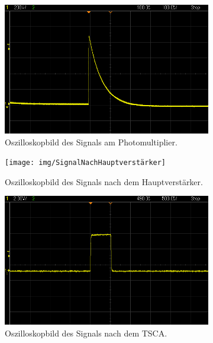 \begin{figure}[H]
	\centering
	\begin{subfigure}[t]{0.495\textwidth}
		\centering
		\includegraphics[width=\textwidth]{img/SignalNachPhotomultiplier}
		\caption{Oszilloskopbild des Signals am Photomultiplier.}
		\label{SignalNachPhotomultiplier}
	\end{subfigure}
	\begin{subfigure}[t]{0.495\textwidth}
		\centering
		\texttt{[image: img/SignalNachHauptverstärker]}
		\caption{Oszilloskopbild des Signals nach dem Hauptverstärker.}
		\label{SignalNachHauptverstärker}
	\end{subfigure}
	\begin{subfigure}[t]{0.495\textwidth}
		\centering
		\includegraphics[width=\textwidth]{img/SignalNachTSCA}
		\caption{Oszilloskopbild des Signals nach dem TSCA.}
		\label{SignalNachTSCA}
	\end{subfigure}
	\begin{subfigure}[t]{0.495\textwidth}

\end{subfigure}
\end{figure}
